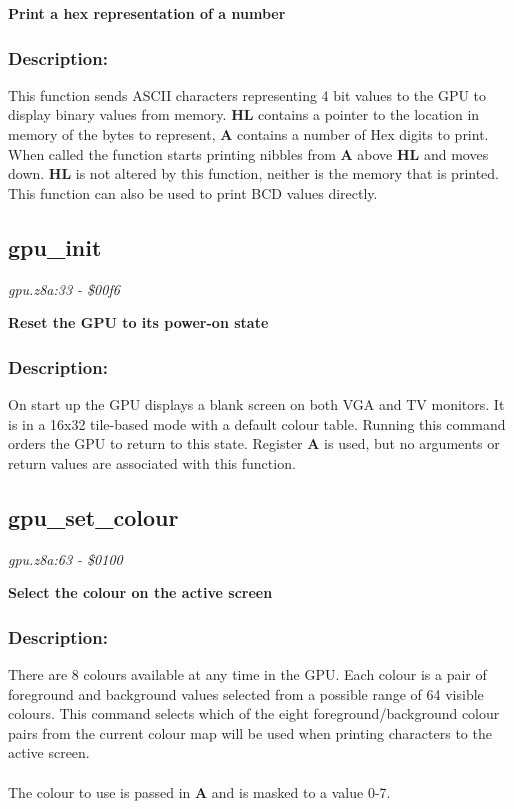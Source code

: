 \noindent
\textbf{Print a hex representation of a number}

\subsubsection{Description:}
 This function sends ASCII characters representing 4 bit values to the GPU to display binary values from memory.  \textbf{HL} contains a pointer to the location in memory of the bytes to represent, \textbf{A} contains a number of Hex digits to print.  When called the function starts printing nibbles from \textbf{A} above \textbf{HL} and moves down.  \textbf{HL} is not altered by this function, neither is the memory that is printed.  This function can also be used to print BCD values directly.

\subsection{gpu\_init}
\textit{gpu.z8a:33 - \$00f6}

\noindent
\textbf{Reset the GPU to its power-on state}

\subsubsection{Description:}
 On start up the GPU displays a blank screen on both VGA and TV monitors.  It is in a 16x32 tile-based mode with a default colour table.  Running this command orders the GPU to return to this state.  Register \textbf{A} is used, but no arguments or return values are associated with this function.

\subsection{gpu\_set\_colour}
\textit{gpu.z8a:63 - \$0100}

\noindent
\textbf{Select the colour on the active screen}

\subsubsection{Description:}
 There are 8 colours available at any time in the GPU.  Each colour is a pair of foreground and background values selected from a possible range of 64 visible colours.  This command selects which of the eight foreground/background colour pairs from the current colour map will be used when printing characters to the active screen.\\\\ The colour to use is passed in \textbf{A} and is masked to a value 0-7.

